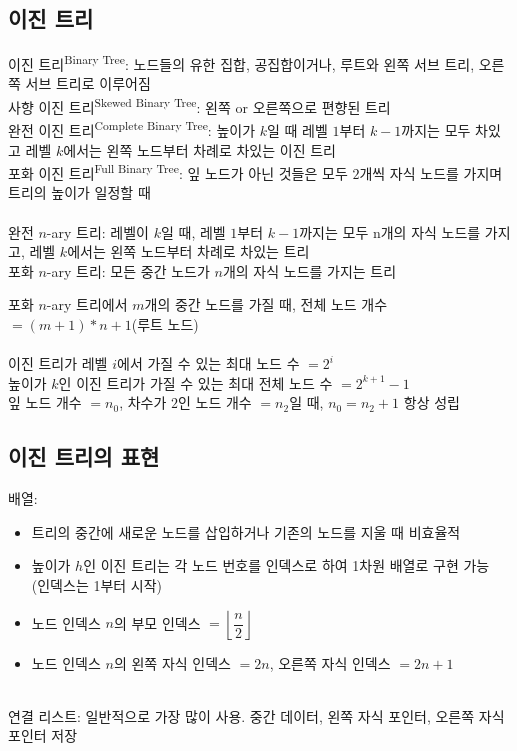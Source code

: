 \subsection{이진 트리}
이진 트리\textsuperscript{Binary Tree}: 노드들의 유한 집합, 공집합이거나, 루트와 왼쪽 서브 트리, 오른쪽 서브 트리로 이루어짐\\
사향 이진 트리\textsuperscript{Skewed Binary Tree}: 왼쪽 or 오른쪽으로 편향된 트리\\
완전 이진 트리\textsuperscript{Complete Binary Tree}: 높이가 $k$일 때 레벨 $1$부터 $k-1$까지는 모두 차있고 레벨 $k$에서는 왼쪽 노드부터 차례로 차있는 이진 트리\\
포화 이진 트리\textsuperscript{Full Binary Tree}: 잎 노드가 아닌 것들은 모두 $2$개씩 자식 노드를 가지며 트리의 높이가 일정할 때
\\\\
완전 $n$-ary 트리: 레벨이 $k$일 때, 레벨 $1$부터 $k-1$까지는 모두 n개의 자식 노드를 가지고, 레벨 $k$에서는 왼쪽 노드부터 차례로 차있는 트리\\
포화 $n$-ary 트리: 모든 중간 노드가 $n$개의 자식 노드를 가지는 트리

포화 $n$-ary 트리에서 $m$개의 중간 노드를 가질 때, 전체 노드 개수 $= (m + 1) * n + 1$(루트 노드)
\\\\
이진 트리가 레벨 $i$에서 가질 수 있는 최대 노드 수 $= 2^i$\\
높이가 $k$인 이진 트리가 가질 수 있는 최대 전체 노드 수 $= 2^{k + 1} - 1$\\
잎 노드 개수 $= n_0$, 차수가 $2$인 노드 개수 $= n_2$일 때, $n_0 = n_2 + 1$ 항상 성립

\subsection{이진 트리의 표현}
배열:
\begin{itemize}
    \item 트리의 중간에 새로운 노드를 삽입하거나 기존의 노드를 지울 때 비효율적
    \item 높이가 $h$인 이진 트리는 각 노드 번호를 인덱스로 하여 1차원 배열로 구현 가능 (인덱스는 1부터 시작)
    \item 노드 인덱스 $n$의 부모 인덱스 $= \left\lfloor \dfrac{n}{2} \right\rfloor$
    \item 노드 인덱스 $n$의 왼쪽 자식 인덱스 $= 2n$, 오른쪽 자식 인덱스 $= 2n + 1$
\end{itemize}\phantom{}\\
연결 리스트: 일반적으로 가장 많이 사용. 중간 데이터, 왼쪽 자식 포인터, 오른쪽 자식 포인터 저장

